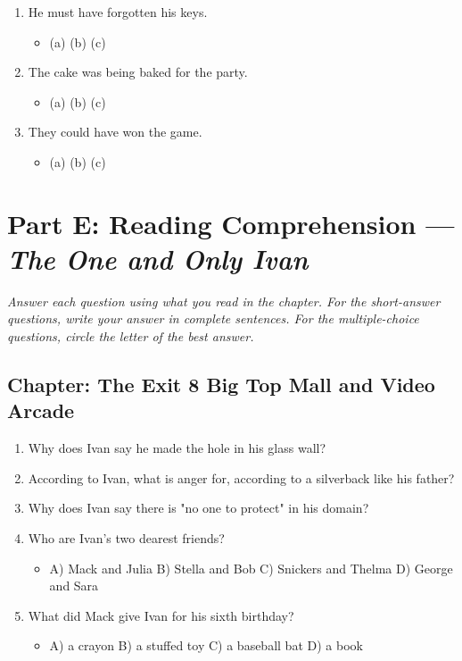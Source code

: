 \documentclass[11pt]{article}
\newcommand{\ansline}{\underline{\hspace{1.1in}}}
\begin{document}
\begin{enumerate}
\begin{itemize}
  \end{itemize}
  \item He must have forgotten his keys.
  \begin{itemize}\setlength\itemsep{0pt}
    \item (a) \ansline \quad (b) \ansline \quad (c) \ansline
  \end{itemize}
  \item The cake was being baked for the party.
  \begin{itemize}\setlength\itemsep{0pt}
    \item (a) \ansline \quad (b) \ansline \quad (c) \ansline
  \end{itemize}
  \item They could have won the game.
  \begin{itemize}\setlength\itemsep{0pt}
    \item (a) \ansline \quad (b) \ansline \quad (c) \ansline
  \end{itemize}
\end{enumerate}

\section*{Part E: Reading Comprehension --- \textit{The One and Only Ivan}}
\noindent\textit{Answer each question using what you read in the chapter. For the short-answer questions, write your answer in complete sentences. For the multiple-choice questions, circle the letter of the best answer.}

\subsection*{Chapter: The Exit 8 Big Top Mall and Video Arcade}
\begin{enumerate}
  \item Why does Ivan say he made the hole in his glass wall?
  \vspace{0.5in}
  \item According to Ivan, what is anger for, according to a silverback like his father?
  \vspace{0.5in}
  \item Why does Ivan say there is "no one to protect" in his domain?
  \vspace{0.5in}
  \item Who are Ivan's two dearest friends?
  \begin{itemize}\setlength\itemsep{0pt}
    \item[] A) Mack and Julia \quad B) Stella and Bob \quad C) Snickers and Thelma \quad D) George and Sara
  \end{itemize}
  \item What did Mack give Ivan for his sixth birthday?
  \begin{itemize}\setlength\itemsep{0pt}
    \item[] A) a crayon \quad B) a stuffed toy \quad C) a baseball bat \quad D) a book
  \end{itemize}
\end{enumerate}
\end{document}
